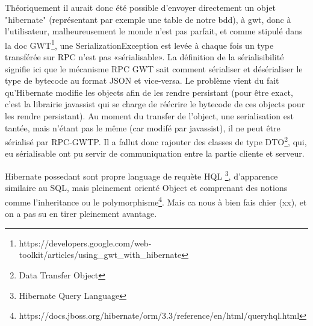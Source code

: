 Théoriquement il aurait donc été possible d'envoyer directement un objet "hibernate" (représentant par exemple une table de notre bdd), à gwt, donc à l'utilisateur, malheureusement le monde n'est pas parfait, et comme stipulé dans la doc GWT\footnote{https://developers.google.com/web-toolkit/articles/using\_gwt\_with\_hibernate},
une SerializationException est levée à chaque fois un type transférée sur RPC n'est pas «sérialisable». La définition de la sérialisibilité signifie ici que le mécanisme RPC GWT sait comment sérialiser et désérialiser le type de bytecode au format JSON et vice-versa.
Le problème vient du fait qu'Hibernate modifie les objects afin de les rendre persistant (pour être exact, c'est la librairie javassist qui se charge de réécrire le bytecode de ces objects pour les rendre persistant). Au moment du transfer de l'object, une serialisation est tantée, mais n'étant pas le même (car modifé par javassist), il ne peut être sérialisé par RPC-GWTP.
Il a fallut donc rajouter des classes de type DTO\footnote{Data Transfer Object}, qui, eu sérialisable ont pu servir de communiquation entre la partie cliente et serveur.

Hibernate possedant sont propre language de requète HQL \footnote{Hibernate Query Language}, d'apparence similaire au SQL, mais pleinement orienté Object et comprenant des notions comme l'inheritance ou le polymorphisme\footnote{https://docs.jboss.org/hibernate/orm/3.3/reference/en/html/queryhql.html}.  Mais ca nous à bien fais chier (xx), et on a pas su en tirer pleinement avantage.

